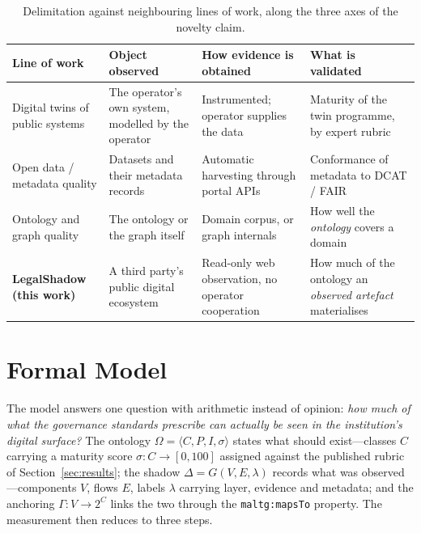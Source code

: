 \documentclass[engproc,proceedingpaper,submit,moreauthors]{Definitions/mdpi}
\begin{document}
\begin{table}[H]
\small
\caption{Delimitation against neighbouring lines of work, along the three axes of the novelty claim.\label{tab:related}}
\begin{tabularx}{\textwidth}{p{2.9cm}XXX}
\toprule
\textbf{Line of work} & \textbf{Object observed} & \textbf{How evidence is obtained} & \textbf{What is validated}\\
\midrule
Digital twins of public systems \cite{Haraguchi2024,DiazSarachaga2025,Anshari2022}
 & The operator's own system, modelled by the operator
 & Instrumented; operator supplies the data
 & Maturity of the twin programme, by expert rubric\\[2pt]
Open data / metadata quality \cite{Neumaier2016,Kubler2018,Vetro2016}
 & Datasets and their metadata records
 & Automatic harvesting through portal APIs
 & Conformance of metadata to DCAT / FAIR\\[2pt]
Ontology and graph quality \cite{Zaitoun2023,AbadNavarro2025,Seo2022}
 & The ontology or the graph itself
 & Domain corpus, or graph internals
 & How well the \emph{ontology} covers a domain\\[2pt]
\textbf{LegalShadow (this work)}
 & A third party's public digital ecosystem
 & Read-only web observation, no operator cooperation
 & How much of the ontology an \emph{observed artefact} materialises\\
\bottomrule
\end{tabularx}
\end{table}

\section{Formal Model}
\label{sec:formal}

The model answers one question with arithmetic instead of opinion: \emph{how much of what the governance standards prescribe can actually be seen in the institution's digital surface?} The ontology $\Omega=\langle C,P,I,\sigma\rangle$ states what should exist---classes $C$ carrying a maturity score $\sigma:C\to[0,100]$ assigned against the published rubric of Section~\ref{sec:results}; the shadow $\Delta=G(V,E,\lambda)$ records what was observed---components $V$, flows $E$, labels $\lambda$ carrying layer, evidence and metadata; and the anchoring $\Gamma:V\to 2^{C}$ links the two through the \texttt{maltg:mapsTo} property. The measurement then reduces to three steps.
\end{document}
